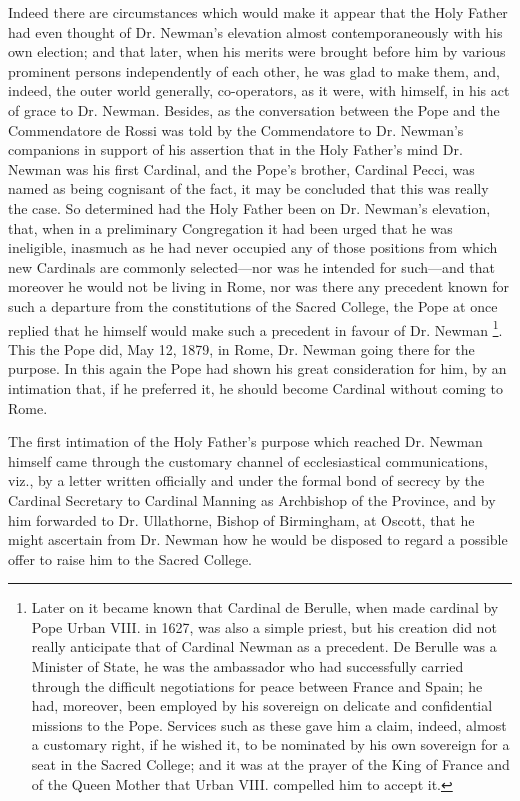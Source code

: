 Indeed there are circumstances which would make it appear that the
Holy Father had even thought of Dr. Newman's elevation almost
contemporaneously with his own election; and that later, when his
merits were brought before him by various prominent persons
independently of each other, he was glad to make them, and, indeed,
the outer world generally, co-operators, as it were, with himself, in
his act of grace to Dr. Newman. Besides, as the conversation between
the Pope and the Commendatore de Rossi was told by the Commendatore to
Dr. Newman's companions in support of his assertion that in the Holy
Father's mind Dr. Newman was his first Cardinal, and the Pope's
brother, Cardinal Pecci, was named as being cognisant of the fact, it
may be concluded that this was really the case. So determined had the
Holy Father been on Dr. Newman's elevation, that, when in a
preliminary Congregation it had been urged that he was ineligible,
inasmuch as he had never occupied any of those positions from which
new Cardinals are commonly selected—nor was he intended for such—and
that moreover he would not be living in Rome, nor was there any
precedent known for such a departure from the constitutions of the
Sacred College, the Pope at once replied that he himself would make
such a precedent in favour of Dr. Newman \footnote{Later on it
became known that Cardinal de Berulle, when made cardinal by Pope
Urban VIII. in 1627, was also a simple priest, but his creation did
not really anticipate that of Cardinal Newman as a precedent. De
Berulle was a Minister of State, he was the ambassador who had
successfully carried through the difficult negotiations for peace
between France and Spain; he had, moreover, been employed by his
sovereign on delicate and confidential missions to the Pope. Services
such as these gave him a claim, indeed, almost a customary right, if
he wished it, to be nominated by his own sovereign for a seat in the
Sacred College; and it was at the prayer of the King of France and of
the Queen Mother that Urban VIII. compelled him to accept it.}. This the Pope did, May 12, 1879, in Rome, Dr. Newman going
there for the purpose. In this again the Pope had shown his great
consideration for him, by an intimation that, if he preferred it, he
should become Cardinal without coming to Rome.

The first intimation of the Holy Father's purpose which reached Dr.
Newman himself came through the customary channel of ecclesiastical
communications, viz., by a letter written officially and under the
formal bond of secrecy by the Cardinal Secretary to Cardinal Manning
as Archbishop of the Province, and by him forwarded to Dr. Ullathorne,
Bishop of Birmingham, at Oscott, that he might ascertain from Dr.
Newman how he would be disposed to regard a possible offer to raise
him to the Sacred College.

